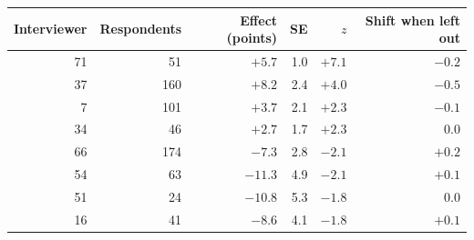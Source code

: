 \begin{tabular}{rrrrrr}
\toprule
Interviewer & Respondents & Effect (points) & SE & $z$ & Shift when left out \\
\midrule
71 & 51 & $+5.7$ & 1.0 & $+7.1$ & $-0.2$ \\
37 & 160 & $+8.2$ & 2.4 & $+4.0$ & $-0.5$ \\
7 & 101 & $+3.7$ & 2.1 & $+2.3$ & $-0.1$ \\
34 & 46 & $+2.7$ & 1.7 & $+2.3$ & $0.0$ \\
66 & 174 & $-7.3$ & 2.8 & $-2.1$ & $+0.2$ \\
54 & 63 & $-11.3$ & 4.9 & $-2.1$ & $+0.1$ \\
51 & 24 & $-10.8$ & 5.3 & $-1.8$ & $0.0$ \\
16 & 41 & $-8.6$ & 4.1 & $-1.8$ & $+0.1$ \\
\bottomrule
\end{tabular}
